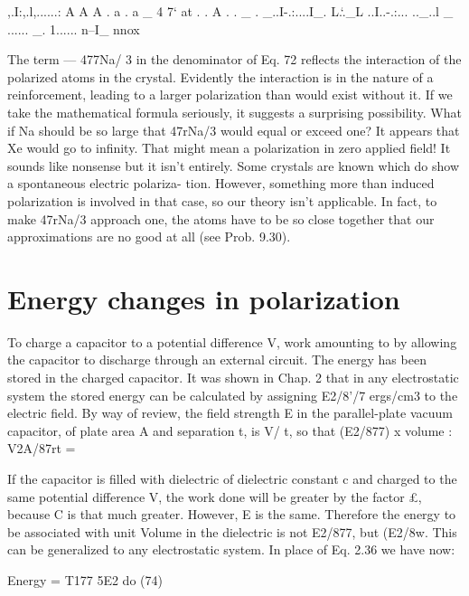{{,.I:,.l,......: A A A . a . a _ 4 7‘ at . . A . . _ . _..I-.:....I_. L.‘._L ..I..-.:... .._..l _ ...... _. 1...... n--I_ nnox

 
 

 

 

The term  --- 477Na/ 3 in the denominator of Eq. 72 reflects the interaction
of the polarized atoms in the crystal. Evidently the interaction
is in the nature of a reinforcement, leading to a larger polarization
than would exist without it. If we take the mathematical formula
seriously, it suggests a surprising possibility. What if Na should be
so large that 47rNa/3 would equal or exceed one? It appears that
Xe would go to infinity. That might mean a polarization in zero
applied field! It sounds like nonsense but it isn't entirely. Some
crystals are known which do show a spontaneous electric polariza-
tion. However, something more than induced polarization is involved
in that case, so our theory isn't applicable. In fact, to make
47rNa/3 approach one, the atoms have to be so close together that
our approximations are no good at all (see Prob. 9.30).

\section{Energy changes in polarization}

To charge a capacitor to a potential difference V, work amounting
to %
by allowing the capacitor to discharge through an external circuit.
The energy has been stored in the charged capacitor. It was shown
in Chap. 2 that in any electrostatic system the stored energy can be
calculated by assigning E2/8'/7 ergs/cm3 to the electric field. By way
of review, the field strength E in the parallel-plate vacuum capacitor,
of plate area A and separation t, is V/ t, so that (E2/877) x volume :
V2A/87rt = %

If the capacitor is filled with dielectric of dielectric constant c and
charged to the same potential difference V, the work done will be
greater by the factor £, because C is that much greater. However,
E is the same. Therefore the energy to be associated with unit
Volume in the dielectric is not E2/877, but (E2/8w. This can be generalized
to any electrostatic system. In place of Eq. 2.36 we have now:

\begin{equation}
\end{equation}
Energy = T177 5E2 do (74)

}}
